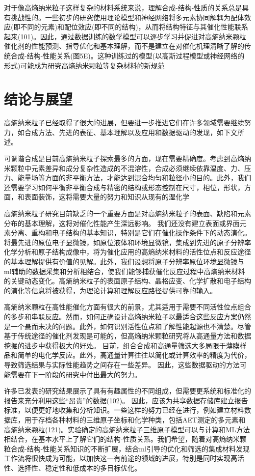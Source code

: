 \documentclass[a4paper]{article}
\begin{document}
对于像高熵纳米粒子这样复杂的材料系统来说，理解合成-结构-性质的关系总是具有挑战性的。一些初步的研究使用理论模型和神经网络将多元素协同解耦为配体效应(即不同的元素)和配位效应(即不同的结构)，从而将结构特征与其催化性能联系起来(101)。因此，通过数据训练的数学模型可以逐步学习并促进对高熵纳米颗粒催化剂的性能预测、指导优化和基本理解，而不是建立在对催化机理清晰了解的传统合成-结构-性能关系(图5E)。这种训练过的模型(以高斯过程模型或神经网络的形式)可能成为研究高熵纳米颗粒等复杂材料的新规范



\section*{结论与展望}
高熵纳米粒子已经取得了很大的进展，但要进一步推进它们在许多领域需要继续努力，如合成方法、先进的表征、基本理解以及应用和数据驱动的发现，如下文所述。

可调谐合成是目前高熵纳米粒子探索最多的方面，现在需要精确度。考虑到高熵纳米颗粒中元素差异和成分复杂性造成的不混溶性，合成必须继续依靠温度、力、压力、能量场等方面的非平衡方法，才能达到混合均匀和粒径小的目的。此外，我们还需要学习如何平衡非平衡合成与精密的结构或形态控制在尺寸，相位，形状，方面，和表面装饰，这将需要大量的努力和知识从现有的湿化学



高熵纳米粒子研究目前缺乏的一个重要方面是对高熵纳米粒子的表面、缺陷和元素分布的基本理解，这将对催化性能产生深远影响。
我们还没有建立表面或界面元素分离、重构和电子结构的基本知识，特别是它们在催化操作条件下的动态演化。将最先进的原位电子显微镜，如原位液体和环境显微镜，集成到先进的原子分辨率化学分析和原子结构成像中，将为催化应用的高熵纳米材料的活性位点和反应途径的基本理解提供有价值的见解。此外，我们设想将原子分辨率原位环境显微镜与ml辅助的数据采集和分析相结合，使我们能够捕获催化反应过程中高熵纳米材料的关键动态变化。高熵纳米粒子的表面原子结构、晶格应变、化学扩散和电子结构的演化等信息将被获得，为理论计算和理解反应路径提供可靠的输入。



高熵纳米颗粒在高性能催化方面有很大的前景，尤其适用于需要不同活性位点组合的多步和串联反应。然而，如何正确设计高熵纳米粒子以最适合这些反应方案仍然是一个悬而未决的问题。此外，如何识别活性位点和了解性能起源也不清楚。尽管基于传统途径的催化剂发现是可能的，但高熵纳米颗粒研究将从高通量方法和数据挖掘的进步中获得极大的好处。
目前，组合合成和高通量筛选大多局限于薄膜样品和简单的电化学反应。此外，高通量计算往往以简化或计算效率的精度为代价，导致筛选结果与实际性能趋势之间存在一些差异。
因此，这些数据驱动的方法可能需要在下一阶段的研究中付出最大的努力。


许多已发表的研究结果展示了具有有趣属性的不同组成，但需要更系统和标准化的报告来充分利用这些“昂贵”的数据(102)。
因此，应该为共享数据存储库建立报告标准，以便更好地收集和分析知识。一些这样的努力已经在进行，例如建立材料数据库，用于存档各种材料的三维原子坐标和化学种类，包括AET测定的多元素和高熵纳米颗粒(121)。实验确定的高熵纳米粒子三维原子模型可以与计算和ML方法相结合，在基本水平上了解它们的结构-性质关系。我们希望，随着对高熵纳米颗粒合成-结构-性能关系知识的不断扩展，结合ml引导的优化和筛选的集成材料发现工作流将很快成为可能，以加快这一有前途的领域的进展，特别是同时实现高活性、选择性、稳定性和低成本的多目标优化。
\end{document}
